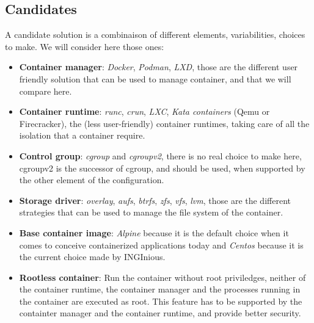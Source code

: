 \subsection{Candidates}\label{subs:candidates}
A candidate solution is a combinaison of different elements, variabilities, choices to make.  We will consider here those ones:
\begin{itemize}
  \renewcommand\labelitemi{--}
  \item \textbf{Container manager}: \textit{Docker}, \textit{Podman}, \textit{LXD}, those are the different user friendly solution that can be used to manage container, and that we will compare here.
  \item \textbf{Container runtime}: \textit{runc}, \textit{crun}, \textit{LXC}, \textit{Kata containers} (Qemu or Firecracker), the (less user-friendly) container runtimes, taking care of all the isolation that a container require.
  \item \textbf{Control group}: \textit{cgroup} and \textit{cgroupv2}, there is no real choice to make here, cgroupv2 is the successor of cgroup, and should be used, when supported by the other element of the configuration.
  \item \textbf{Storage driver}: \textit{overlay}, \textit{aufs}, \textit{btrfs}, \textit{zfs}, \textit{vfs}, \textit{lvm}, those are the different strategies that can be used to manage the file system of the container.
  \item \textbf{Base container image}: \textit{Alpine} because it is the default choice when it comes to conceive containerized applications today and \textit{Centos} because it is the current choice made by INGInious.
  \item \textbf{Rootless container}: Run the container without root priviledges, neither of the container runtime, the container manager and the processes running in the container are executed as root.  This feature has to be supported by the containter manager and the container runtime, and provide better security.
\end{itemize}

